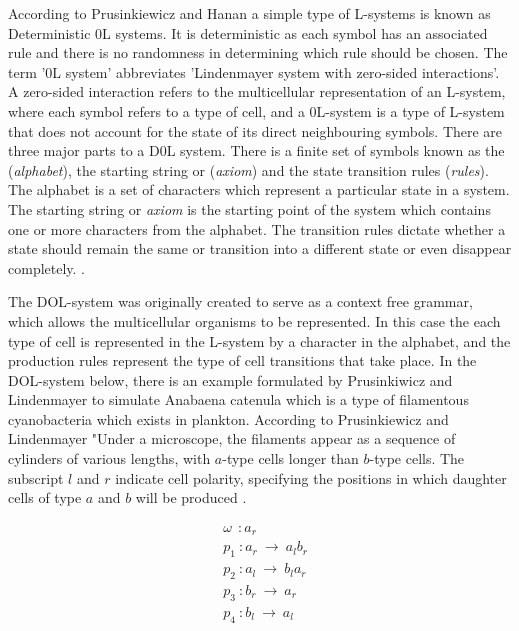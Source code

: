 \begin{flushleft}

According to Prusinkiewicz and Hanan a simple type of L-systems is known as Deterministic 0L systems. It is deterministic as each symbol has an associated rule and there is no randomness in determining which rule should be chosen. The term '0L system' abbreviates 'Lindenmayer system with zero-sided interactions'. A zero-sided interaction refers to the multicellular representation of an L-system, where each symbol refers to a type of cell, and a 0L-system is a type of L-system that does not account for the state of its direct neighbouring symbols. There are three major parts to a D0L system. There is a finite set of symbols known as the (\textit{alphabet}), the starting string or (\textit{axiom}) and the state transition rules (\textit{rules}). The alphabet is a set of characters which represent a particular state in a system. The starting string or \textit{axiom} is the starting point of the system which contains one or more characters from the alphabet. The transition rules dictate whether a state should remain the same or transition into a different state or even disappear completely. \cite{prusinkiewicz2013lindenmayer}. \\

\vspace{5mm}

The DOL-system was originally created to serve as a context free grammar, which allows the multicellular organisms to be represented. In this case the each type of cell is represented in the L-system by a character in the alphabet, and the production rules represent the type of cell transitions that take place. In the DOL-system below, there is an example formulated by Prusinkiwicz and Lindenmayer to simulate Anabaena catenula which is a type of filamentous cyanobacteria which exists in plankton. According to Prusinkiewicz and Lindenmayer "Under a microscope, the filaments appear as a sequence of cylinders of various lengths, with $a$-type cells longer than $b$-type cells. The subscript $l$ and $r$ indicate cell polarity, specifying the positions in which daughter cells of type $a$ and $b$ will be produced \cite{prusinkiewicz2012algorithmic}.

\vspace{5mm}

\begin{equation} \label{DOL-system example}
\begin{aligned}
	&\omega~~ : a_r \\
	&p_1~ :  a_r~ \rightarrow~ a_l b_r\\
	&p_2~ :  a_l~ \rightarrow~ b_l a_r\\
	&p_3~ :  b_r~ \rightarrow~ a_r\\
	&p_4~ :  b_l~ \rightarrow~ a_l\\
\end{aligned}
\end{equation}


\end{flushleft}
